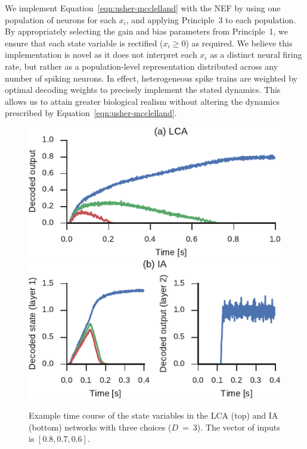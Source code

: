 \documentclass[10pt,letterpaper]{article}
\begin{document}
We implement Equation~\ref{eqn:usher-mcclelland} with the NEF by using one population of neurons for each $x_i$, and applying Principle~3 to each population.
By appropriately selecting the gain and bias parameters from Principle~1, we ensure that each state variable is rectified ($x_i \ge 0$) as required.
We believe this implementation is novel as it does not interpret each $x_i$ as a distinct neural firing rate, but rather as a population-level representation distributed across any number of spiking neurons.
In effect, heterogeneous spike trains are weighted by optimal decoding weights to precisely implement the stated dynamics.
This allows us to attain greater biological realism without altering the dynamics prescribed by Equation~\ref{eqn:usher-mcclelland}.
\begin{figure}[t]
    \centering
    \includegraphics{figures/usher-mcclelland}\\
    \vspace*{.3cm}
    \includegraphics{figures/indacc}
    \caption{
        Example time course of the state variables in the LCA (top) and IA (bottom) networks with three choices ($D~=~3$).
        The vector of inputs is $\left[ 0.8, 0.7, 0.6 \right]$.
    }\label{fig:usher-mcclelland}\label{fig:indacc}
\end{figure}
\end{document}
